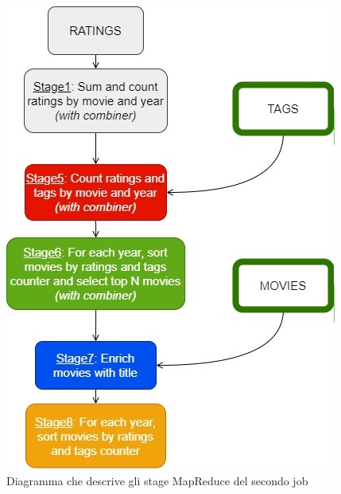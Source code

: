 \documentclass[10pt]{article}
\begin{document}
\begin{figure}[th]
	\centering
	\includegraphics[scale=0.76]{images/MapReduceFlow2.jpg}
	\caption{Diagramma che descrive gli stage MapReduce del secondo job}
\end{figure}
\end{document}
